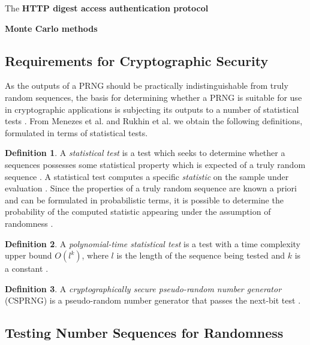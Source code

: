 \documentclass[12pt, titlepage]{report}
\theoremstyle{definition}
\newtheorem{definition}{Definition}
\begin{document}
The \textbf{HTTP digest access authentication protocol} 

\textbf{Monte Carlo methods} 



\subsection{Requirements for Cryptographic Security}\label{subsection:crypto_requirements}
As the outputs of a PRNG should be practically indistinguishable from truly random sequences, the basis for determining whether a PRNG is suitable for use in cryptographic applications is subjecting its outputs to a number of statistical tests \cite[p. 170]{menezes1996handbook}. From Menezes et al. and Rukhin et al. we obtain the following definitions, formulated in terms of statistical tests.

\begin{definition}
A \emph{statistical test} is a test which seeks to determine whether a sequences possesses some statistical property which is expected of a truly random sequence \cite[p. 175]{menezes1996handbook}. A statistical test computes a specific \emph{statistic} on the sample under evaluation \cite[p. 179]{menezes1996handbook}. Since the properties of a truly random sequence are known a priori and can be formulated in probabilistic terms, it is possible to determine the probability of the computed statistic appearing under the assumption of randomness \cite[s 1-3]{rukhin2001statistical}.
\end{definition}

\begin{definition}
A \emph{polynomial-time statistical test} is a test with a time complexity upper bound $O(l^k)$, where $l$ is the length of the sequence being tested and $k$ is a constant \cite[p. 171]{menezes1996handbook}.
\end{definition}


\begin{definition}
A \textit{cryptographically secure pseudo-random number generator} (CSPRNG) is a pseudo-random number generator that passes the next-bit test \cite[p. 171]{menezes1996handbook}.
\end{definition}





\subsection{Testing Number Sequences for Randomness}\label{subsection:testing_prngs}
\end{document}
